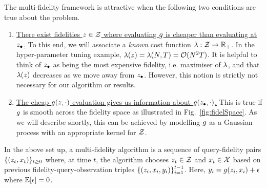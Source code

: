 The multi-fidelity framework is attractive when the following two conditions are true
about the problem.
\vspace{-0.10in}
\begin{enumerate}[leftmargin=0.19in]
\item
\ul{There exist fidelities $z\in\mathcal{Z}$ where evaluating $g$ is cheaper than
evaluating at $z_{\bullet}$.}
To this end, we will associate a \emph{known} cost function $\lambda:\mathcal{Z}\rightarrow
\mathbb{R}_+$.
In the hyper-parameter tuning example, $\lambda(z) = \lambda(N,T) = \mathcal{O}(N^2T)$.
It is helpful to think of $z_{\bullet}$ as being the most expensive fidelity,
i.e. maximiser of $\lambda$, and that $\lambda(z)$ decreases as we move away from
$z_{\bullet}$. 
However, this notion is strictly not necessary for our algorithm
or results.\hspace{-0.1in}
\vspace{-0.06in}
\item
\ul{The cheap $g(z,\cdot)$ evaluation gives us information about
$g(z_{\bullet},\cdot)$.}
This is true if $g$ is smooth across the fidelity space
as illustrated in Fig.~\ref{fig:fidelSpace}.
As we will describe shortly, this can be achieved by modelling $g$ as a Gaussian process
with an appropriate kernel for $\mathcal{Z}$.
\end{enumerate}
\vspace{-0.12in}

In the above set up, a multi-fidelity algorithm is a sequence of query-fidelity pairs
$\{(z_t,x_t)\}_{t\geq 0}$
where, at time $t$, the algorithm chooses $z_t\in\mathcal{Z}$ and $x_t\in\mathcal{X}$ based on
previous fidelity-query-observation triples $\{(z_i,x_i,y_i)\}_{i=1}^{t-1}$.
Here, $y_i = g(z_i,x_i) + \epsilon$ where $\mathbb{E}[\epsilon] = 0$.

